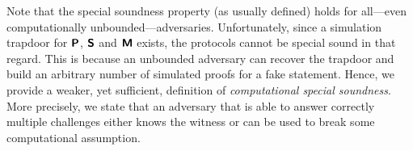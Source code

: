 Note that the special soundness property (as usually defined) holds for
all---even computationally unbounded---adversaries. Unfortunately, since a
simulation trapdoor for $\bm{\mathsf{P}}$, $\bm{\mathsf{S}}$ and $\bm{\mathsf{M}}$ exists, the protocols
cannot be special sound in that regard. This is because an unbounded adversary
can recover the trapdoor and build an arbitrary number of simulated proofs for a fake
statement. Hence, we provide a weaker, yet sufficient, definition of
\emph{computational special soundness}. More precisely, we state that an
adversary that is able to answer correctly multiple challenges either knows the
witness or can be used to break some computational assumption.
